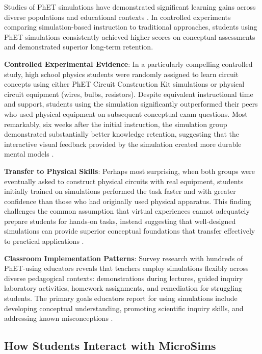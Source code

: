 Studies of PhET simulations have demonstrated significant learning gains across diverse populations and educational contexts \cite{adams2008study, finkelstein2005phet, perkins2006phet}. In controlled experiments comparing simulation-based instruction to traditional approaches, students using PhET simulations consistently achieved higher scores on conceptual assessments and demonstrated superior long-term retention.

\textbf{Controlled Experimental Evidence}: In a particularly compelling controlled study, high school physics students were randomly assigned to learn circuit concepts using either PhET Circuit Construction Kit simulations or physical circuit equipment (wires, bulbs, resistors). Despite equivalent instructional time and support, students using the simulation significantly outperformed their peers who used physical equipment on subsequent conceptual exam questions. Most remarkably, six weeks after the initial instruction, the simulation group demonstrated substantially better knowledge retention, suggesting that the interactive visual feedback provided by the simulation created more durable mental models \cite{finkelstein2005phet}.

\textbf{Transfer to Physical Skills}: Perhaps most surprising, when both groups were eventually asked to construct physical circuits with real equipment, students initially trained on simulations performed the task faster and with greater confidence than those who had originally used physical apparatus. This finding challenges the common assumption that virtual experiences cannot adequately prepare students for hands-on tasks, instead suggesting that well-designed simulations can provide superior conceptual foundations that transfer effectively to practical applications \cite{finkelstein2005phet}.

\textbf{Classroom Implementation Patterns}: Survey research with hundreds of PhET-using educators reveals that teachers employ simulations flexibly across diverse pedagogical contexts: demonstrations during lectures, guided inquiry laboratory activities, homework assignments, and remediation for struggling students. The primary goals educators report for using simulations include developing conceptual understanding, promoting scientific inquiry skills, and addressing known misconceptions \cite{phet2023}.

\subsection{How Students Interact with MicroSims}

